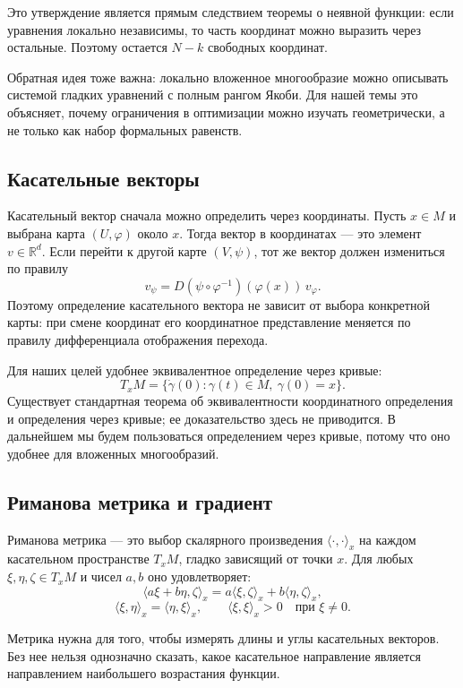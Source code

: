 \documentclass[a4paper,12pt]{article}
\newcommand{\R}{\mathbb{R}}
\begin{document}
Это утверждение является прямым следствием теоремы о неявной функции: если уравнения локально независимы, то часть координат можно выразить через остальные. Поэтому остается $N-k$ свободных координат.

Обратная идея тоже важна: локально вложенное многообразие можно описывать системой гладких уравнений с полным рангом Якоби. Для нашей темы это объясняет, почему ограничения в оптимизации можно изучать геометрически, а не только как набор формальных равенств.

\subsection{Касательные векторы}

Касательный вектор сначала можно определить через координаты. Пусть $x\in M$ и выбрана карта $(U,\varphi)$ около $x$. Тогда вектор в координатах --- это элемент $v\in\R^d$. Если перейти к другой карте $(V,\psi)$, тот же вектор должен измениться по правилу
\[
v_\psi =
D(\psi\circ\varphi^{-1})(\varphi(x))\,v_\varphi.
\]
Поэтому определение касательного вектора не зависит от выбора конкретной карты: при смене координат его координатное представление меняется по правилу дифференциала отображения перехода.

Для наших целей удобнее эквивалентное определение через кривые:
\[
T_xM=\{\dot\gamma(0):\gamma(t)\in M,\ \gamma(0)=x\}.
\]
Существует стандартная теорема об эквивалентности координатного определения и определения через кривые; ее доказательство здесь не приводится. В дальнейшем мы будем пользоваться определением через кривые, потому что оно удобнее для вложенных многообразий.

\subsection{Риманова метрика и градиент}

\begin{definition}
Риманова метрика --- это выбор скалярного произведения $\langle\cdot,\cdot\rangle_x$ на каждом касательном пространстве $T_xM$, гладко зависящий от точки $x$. Для любых $\xi,\eta,\zeta\in T_xM$ и чисел $a,b$ оно удовлетворяет:
\[
\langle a\xi+b\eta,\zeta\rangle_x
=a\langle\xi,\zeta\rangle_x+b\langle\eta,\zeta\rangle_x,
\]
\[
\langle \xi,\eta\rangle_x=\langle\eta,\xi\rangle_x,\qquad
\langle\xi,\xi\rangle_x>0\quad \text{при }\xi\ne 0.
\]
\end{definition}

Метрика нужна для того, чтобы измерять длины и углы касательных векторов. Без нее нельзя однозначно сказать, какое касательное направление является направлением наибольшего возрастания функции.
\end{document}

